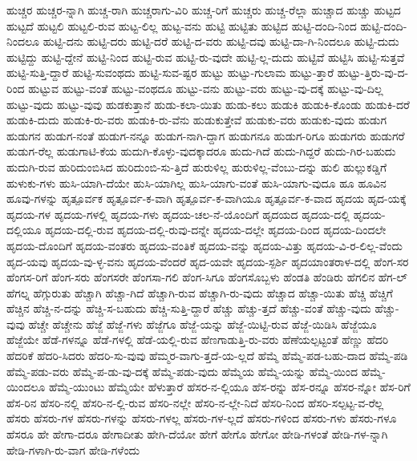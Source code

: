 {ಹುಚ್ಚರ
ಹುಚ್ಚರ-ನ್ನಾಗಿ
ಹುಚ್ಚ-ರಾಗಿ
ಹುಚ್ಚರಾಗು-ವಿರಿ
ಹುಚ್ಚ-ರಿಗೆ
ಹುಚ್ಚರು
ಹುಚ್ಚ-ರೆಲ್ಲಾ
ಹುಚ್ಚಾದ
ಹುಚ್ಚು
ಹುಟ್ಟದ
ಹುಟ್ಟದೆ
ಹುಟ್ಟಲಿ
ಹುಟ್ಟಲಿ-ರುವ
ಹುಟ್ಟ-ಲಿಲ್ಲ
ಹುಟ್ಟ-ವನು
ಹುಟ್ಟಿ
ಹುಟ್ಟಿತು
ಹುಟ್ಟಿದ
ಹುಟ್ಟಿ-ದಂದಿ-ನಿಂದ
ಹುಟ್ಟಿ-ದಂದಿ-ನಿಂದಲೂ
ಹುಟ್ಟಿ-ದನು
ಹುಟ್ಟಿ-ದರು
ಹುಟ್ಟಿ-ದರೆ
ಹುಟ್ಟಿ-ದ-ವರು
ಹುಟ್ಟಿ-ದವು
ಹುಟ್ಟಿ-ದಾ-ಗಿ-ನಿಂದಲೂ
ಹುಟ್ಟಿ-ದುದು
ಹುಟ್ಟಿದ್ದು
ಹುಟ್ಟಿ-ದ್ದೇನೆ
ಹುಟ್ಟಿ-ನಿಂದ
ಹುಟ್ಟಿ-ರುವ
ಹುಟ್ಟಿ-ರು-ವುದೇ
ಹುಟ್ಟಿ-ಲ್ಲ-ದುದು
ಹುಟ್ಟಿವೆ
ಹುಟ್ಟಿಸಿ
ಹುಟ್ಟಿ-ಸುತ್ತವೆ
ಹುಟ್ಟಿ-ಸುತ್ತಿ-ದ್ದಾರೆ
ಹುಟ್ಟಿ-ಸುವಂಥದು
ಹುಟ್ಟಿ-ಸುವ-ಷ್ಟರ
ಹುಟ್ಟು
ಹುಟ್ಟು-ಗುಲಾಮ
ಹುಟ್ಟು-ತ್ತಾರೆ
ಹುಟ್ಟು-ತ್ತಿರು-ವು-ದ-ರಿಂದ
ಹುಟ್ಟುವ
ಹುಟ್ಟು-ವಂತೆ
ಹುಟ್ಟು-ವಂಥದೂ
ಹುಟ್ಟು-ವನು
ಹುಟ್ಟು-ವರು
ಹುಟ್ಟು-ವು-ದಕ್ಕೆ
ಹುಟ್ಟು-ವು-ದಿಲ್ಲ
ಹುಟ್ಟು-ವುದು
ಹುಟ್ಟು-ವುವು
ಹುಡಕುತ್ತಾನೆ
ಹುಡು-ಕಲಾ-ಯಿತು
ಹುಡು-ಕಲು
ಹುಡುಕಿ
ಹುಡುಕಿ-ಕೊಂಡು
ಹುಡುಕಿ-ದರೆ
ಹುಡುಕಿ-ದುದು
ಹುಡುಕಿ-ರು-ವರು
ಹುಡುಕಿ-ರು-ವೆನು
ಹುಡುಕುತ್ತೇವೆ
ಹುಡುಕು-ವರು
ಹುಡುಕು-ವುದು
ಹುಡುಗ
ಹುಡುಗನ
ಹುಡುಗ-ನಂತೆ
ಹುಡುಗ-ನನ್ನೂ
ಹುಡುಗ-ನಾಗಿ-ದ್ದಾಗ
ಹುಡುಗನೂ
ಹುಡುಗ-ರಿಗೂ
ಹುಡುಗರು
ಹುಡುಗರೆ
ಹುಡುಗ-ರೆಲ್ಲ
ಹುಡುಗಾಟಿ-ಕೆಯ
ಹುದುಗಿ-ಕೊಳ್ಳು-ವುದಕ್ಕಾದರೂ
ಹುದು-ಗಿದೆ
ಹುದು-ಗಿದ್ದರೆ
ಹುದು-ಗಿರ-ಬಹುದು
ಹುದುಗಿ-ರುವ
ಹುರಿದುಂಬಿಸಿದ
ಹುರಿದುಂಬಿ-ಸು-ತ್ತಿದೆ
ಹುರುಳಿಲ್ಲ
ಹುರುಳಿಲ್ಲ-ವೆಂಬು-ದನ್ನು
ಹುಲಿ
ಹುಲ್ಲುಕಡ್ಡಿಗೆ
ಹುಳುಕು-ಗಳು
ಹುಸಿ-ಯಾಗಿ-ದೆಯೇ
ಹುಸಿ-ಯಾಗಿಲ್ಲ
ಹುಸಿ-ಯಾಗು-ವಂತೆ
ಹುಸಿ-ಯಾಗು-ವುದೂ
ಹೂ
ಹೂವಿನ
ಹೂವು-ಗಳನ್ನು
ಹೃತ್ಪೂರ್ವಕ
ಹೃತ್ಪೂರ್ವ-ಕ-ವಾಗಿ
ಹೃತ್ಪೂರ್ವ-ಕ-ವಾಗಿಯೂ
ಹೃತ್ಪೂರ್ವ-ಕ-ವಾದ
ಹೃದಯ
ಹೃದ-ಯಕ್ಕೆ
ಹೃದಯ-ಗಳ
ಹೃದಯ-ಗಳಲ್ಲಿ
ಹೃದಯ-ಗಳು
ಹೃದಯ-ಚಲ-ನೆ-ಯೊಂದಿಗೆ
ಹೃದಯದ
ಹೃದಯ-ದಲ್ಲಿ
ಹೃದಯ-ದಲ್ಲಿಯೂ
ಹೃದಯ-ದಲ್ಲಿ-ರುವ
ಹೃದಯ-ದಲ್ಲಿ-ರುವು-ದನ್ನೇ
ಹೃದಯ-ದಲ್ಲೇ
ಹೃದಯ-ದಿಂದ
ಹೃದಯ-ದಿಂದಲೇ
ಹೃದಯ-ದೊಂದಿಗೆ
ಹೃದಯ-ವಂತರು
ಹೃದಯ-ವಂತಿಕೆ
ಹೃದಯ-ವನ್ನು
ಹೃದಯ-ವಿತ್ತು
ಹೃದಯ-ವಿ-ರ-ಲಿಲ್ಲ-ವೆಂದು
ಹೃದ-ಯವು
ಹೃದಯ-ವು-ಳ್ಳ-ವನು
ಹೃದಯ-ವೆಂದರೆ
ಹೃದ-ಯವೇ
ಹೃದಯ-ಸ್ಪರ್ಶಿ
ಹೃದಯಾಂತರಾಳ-ದಲ್ಲಿ
ಹೆಂಗ-ಸರ
ಹೆಂಗಸ-ರಿಗೆ
ಹೆಂಗ-ಸರು
ಹೆಂಗಸರೇ
ಹೆಂಗಸಾ-ಗಲಿ
ಹೆಂಗ-ಸಿಗೂ
ಹೆಂಗಸೊಬ್ಬಳು
ಹೆಂಡತಿ
ಹೆಂಡಿರು
ಹೆಗಲಿನ
ಹೆಗ-ಲ್
ಹೆಗಲ್ನ
ಹೆಗ್ಗುರುತು
ಹೆಚ್ಚಾಗಿ
ಹೆಚ್ಚಾ-ಗಿದೆ
ಹೆಚ್ಚಾಗಿ-ರುವ
ಹೆಚ್ಚಾಗಿ-ರು-ವುದು
ಹೆಚ್ಚಾದ
ಹೆಚ್ಚಾ-ಯಿತು
ಹೆಚ್ಚಿ
ಹೆಚ್ಚಿಗೆ
ಹೆಚ್ಚಿನ
ಹೆಚ್ಚಿ-ನ-ದನ್ನು
ಹೆಚ್ಚಿ-ಸ-ಬಹುದು
ಹೆಚ್ಚಿ-ಸುತ್ತಿ-ದ್ದಾರೆ
ಹೆಚ್ಚು
ಹೆಚ್ಚು-ತ್ತದೆ
ಹೆಚ್ಚು-ವಂತೆ
ಹೆಚ್ಚು-ವುದು
ಹೆಚ್ಚು-ವುವು
ಹೆಚ್ಚೇ
ಹೆಚ್ಚೇನು
ಹೆಜ್ಜೆ
ಹೆಜ್ಜೆ-ಗಳು
ಹೆಜ್ಜೆಗೂ
ಹೆಜ್ಜೆ-ಯನ್ನು
ಹೆಜ್ಜೆ-ಯಿಟ್ಟಿ-ರುವ
ಹೆಜ್ಜೆ-ಯಿಡಿಸಿ
ಹೆಜ್ಜೆಯೂ
ಹೆಜ್ಜೆಯೇ
ಹೆಡೆ-ಗಳನ್ನೂ
ಹೆಡೆ-ಗಳಲ್ಲಿ
ಹೆಡೆ-ಯಲ್ಲಿ-ರುವ
ಹೆಣಗಾಡುತ್ತಿ-ರು-ವರು
ಹೆಣೆಯಲ್ಪಟ್ಟಂತೆ
ಹೆಣ್ಣು
ಹೆದರಿ
ಹೆದರಿಕೆ
ಹೆದರಿ-ಸಿದರು
ಹೆದರಿ-ಸು-ವುವು
ಹೆಮ್ಮರ-ವಾಗು-ತ್ತದೆ-ಯ-ಲ್ಲದೆ
ಹೆಮ್ಮೆ
ಹೆಮ್ಮೆ-ಪಡ-ಬಹು-ದಾದ
ಹೆಮ್ಮೆ-ಪಡಿ
ಹೆಮ್ಮೆ-ಪಡು-ವರು
ಹೆಮ್ಮೆ-ಪ-ಡು-ವು-ದಕ್ಕೆ
ಹೆಮ್ಮೆ-ಪಡು-ವುದು
ಹೆಮ್ಮೆಯ
ಹೆಮ್ಮೆ-ಯನ್ನು
ಹೆಮ್ಮೆ-ಯಿಂದ
ಹೆಮ್ಮೆ-ಯಿಂದಲೂ
ಹೆಮ್ಮೆ-ಯುಂಟು
ಹೆಮ್ಮೆಯೇ
ಹೆಳುತ್ತಾರೆ
ಹೆಸರ-ನ-ಲ್ಲಿಯೂ
ಹೆಸ-ರನ್ನು
ಹೆಸ-ರನ್ನೂ
ಹೆಸರ-ನ್ನೋ
ಹೆಸ-ರಿಗೆ
ಹೆಸ-ರಿನ
ಹೆಸರಿ-ನಲ್ಲಿ
ಹೆಸರಿ-ನ-ಲ್ಲಿ-ರುವ
ಹೆಸರಿ-ನಲ್ಲೇ
ಹೆಸರಿ-ನ-ಲ್ಲೇ-ನಿದೆ
ಹೆಸರಿ-ನಿಂದ
ಹೆಸರಿ-ಸಲ್ಪಟ್ಟ-ವ-ರೆಲ್ಲ
ಹೆಸರು
ಹೆಸರು-ಗಳ
ಹೆಸರು-ಗಳನ್ನು
ಹೆಸರು-ಗಳಲ್ಲ
ಹೆಸರು-ಗಳ-ಲ್ಲದೆ
ಹೆಸರು-ಗಳಿಂದ
ಹೆಸರು-ಗಳು
ಹೆಸರು-ಗಳೂ
ಹೆಸರೂ
ಹೇ
ಹೇಗಾ-ದರೂ
ಹೇಗಾದೀತು
ಹೇಗಿ-ದೆಯೋ
ಹೇಗೆ
ಹೇಗೊ
ಹೇಗೋ
ಹೇಡಿ-ಗಳಂತೆ
ಹೇಡಿ-ಗಳ-ನ್ನಾಗಿ
ಹೇಡಿ-ಗಳಾಗಿ-ರು-ವಾಗ
ಹೇಡಿ-ಗಳೆಂದು
}
